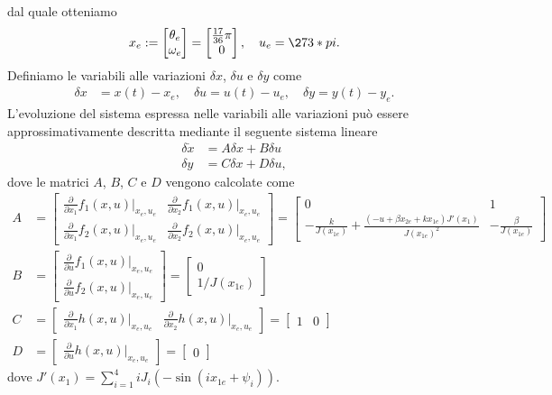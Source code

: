 \documentclass[a4paper, 11pt]{article}
\begin{document}
%
dal quale otteniamo
%
\begin{align}
	x_e := \begin{bmatrix}
		\theta_e \\
		\omega_e
	\end{bmatrix} = \begin{bmatrix}
		\frac{17}{36}\pi \\
		0
	\end{bmatrix},  \quad u_e = \273*pi.\label{eq:equilibirum_pair}
\end{align}
%
Definiamo le variabili alle variazioni $\delta x$, $\delta u$ e $\delta y$ come 
%
\begin{align*}
	\delta x &= x(t) - x_e, 
	\quad
	\delta u = u(t) - u_e, 
	\quad
	\delta y = y(t) - y_e.
\end{align*}
%
L'evoluzione del sistema espressa nelle variabili alle variazioni pu\`o essere approssimativamente descritta mediante il seguente sistema lineare
%
\begin{subequations}\label{eq:linearized_system}
\begin{align}
	\delta \dot{x} &= A\delta x + B\delta u
	\\
	\delta y &= C\delta x + D\delta u,
\end{align}
\end{subequations}
%
dove le matrici $A$, $B$, $C$ e $D$ vengono calcolate come
%
\newcommand{\pdv}[2]{\frac{\partial}{\partial #1}#2(x,u)|_{x_e,u_e}}
\begin{subequations}\label{eq:matrices}
\begin{align}
	A &=\begin{bmatrix}
		\pdv{x_1}{f_1} & \pdv{x_2}{f_1} \\
		\pdv{x_1}{f_2} & \pdv{x_2}{f_2}
	\end{bmatrix} = \begin{bmatrix}
		0 & 1 \\
		-\frac{k}{J(x_{1e})} + \frac{(-u+\beta x_{2e}+kx_{1e})J'(x_1)}{J(x_{1e})^2} & -\frac{\beta}{J(x_{1e})}
	\end{bmatrix}
	\\
	B &=\begin{bmatrix}
		\pdv{u}{f_1} \\
		\pdv{u}{f_2}
	\end{bmatrix} = \begin{bmatrix}
		0 \\
		1/J(x_{1e})
	\end{bmatrix}
	\\
	C &=\begin{bmatrix}
		\pdv{x_1}{h} & \pdv{x_2}{h}
	\end{bmatrix} = \begin{bmatrix}
		1 & 0
	\end{bmatrix}
	\\
	D &= \begin{bmatrix}
		\pdv{u}{h}
	\end{bmatrix} = \begin{bmatrix}
		0
	\end{bmatrix}
\end{align}
\end{subequations}
dove $J'(x_1)=\sum_{i=1}^{4}iJ_i(-\sin(ix_{1e}+\psi_i))$.
\end{document}

